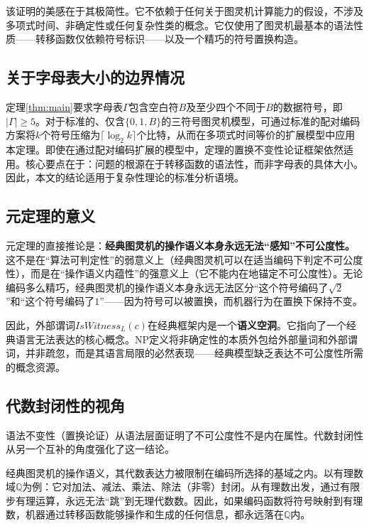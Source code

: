 \documentclass{ctexart}
\begin{document}
	该证明的美感在于其极简性。它不依赖于任何关于图灵机计算能力的假设，不涉及多项式时间、非确定性或任何复杂性类的概念。它仅使用了图灵机最基本的语法性质——转移函数仅依赖符号标识——以及一个精巧的符号置换构造。
	
	\subsection{关于字母表大小的边界情况}
	
	定理\ref{thm:main}要求字母表$\Gamma$包含空白符$B$及至少四个不同于$B$的数据符号，即$|\Gamma| \ge 5$。对于标准的、仅含$\{0,1,B\}$的三符号图灵机模型，可通过标准的配对编码方案将$k$个符号压缩为$\lceil \log_2 k \rceil$个比特，从而在多项式时间等价的扩展模型中应用本定理。即使在通过配对编码扩展的模型中，定理的置换不变性论证框架依然适用。核心要点在于：问题的根源在于转移函数的语法性，而非字母表的具体大小。因此，本文的结论适用于复杂性理论的标准分析语境。
	
	\subsection{元定理的意义}
	
	元定理的直接推论是：\textbf{经典图灵机的操作语义本身永远无法``感知''不可公度性。}这不是在``算法可判定性''的弱意义上（经典图灵机可以在适当编码下判定不可公度性），而是在``操作语义内蕴性''的强意义上（它不能内在地锚定不可公度性）。无论编码多么精巧，经典图灵机的操作语义本身永远无法区分``这个符号编码了$\sqrt{2}$''和``这个符号编码了$1$''——因为符号可以被置换，而机器行为在置换下保持不变。
	
	因此，外部谓词$IsWitness_L(c)$在经典框架内是一个\textbf{语义空洞}。它指向了一个经典语言无法表达的核心概念。NP定义将非确定性的本质外包给外部量词和外部谓词，并非疏忽，而是其语言局限的必然表现——经典模型缺乏表达不可公度性所需的概念资源。
	
	\subsection{代数封闭性的视角}
	
	语法不变性（置换论证）从语法层面证明了不可公度性不是内在属性。代数封闭性从另一个互补的角度强化了这一结论。
	
	经典图灵机的操作语义，其代数表达力被限制在编码所选择的基域之内。以有理数域$\mathbb{Q}$为例：它对加法、减法、乘法、除法（非零）封闭。从有理数出发，通过有限步有理运算，永远无法``跳''到无理代数数。因此，如果编码函数将符号映射到有理数，机器通过转移函数能够操作和生成的任何信息，都永远落在$\mathbb{Q}$内。
	
\end{document}
